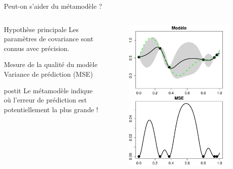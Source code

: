 \begin{frame}{Peut-on s'aider du métamodèle ?}
\begin{columns}[t]
\begin{column}{6cm}
\begin{block}{Hypothèse principale}
Les paramètres de covariance sont connus avec précision.
\end{block}

\begin{block}{Mesure de la qualité du modèle} 
Variance de prédiction (MSE)
\end{block}

\begin{beamercolorbox}[sep=1em,wd=\columnwidth]{postit}
Le métamodèle indique où l'erreur de prédiction est potentiellement la plus grande !
\end{beamercolorbox}

\end{column}

\begin{column}{6cm}
\begin{figure}
	\centering
		\includegraphics[width=.8\textwidth]{autres/MSE.pdf}
\end{figure}
\end{column}
\end{columns}
\end{frame}
